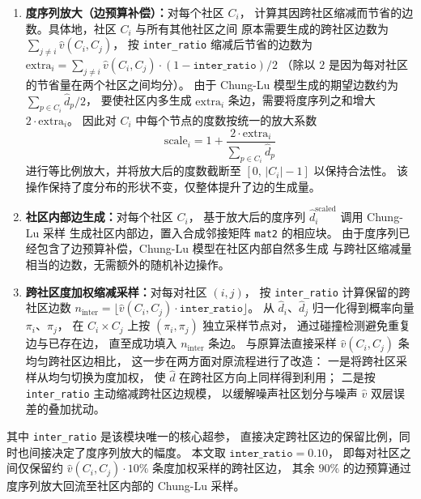 \begin{enumerate}
    \item \textbf{度序列放大（边预算补偿）：}对每个社区 $C_i$，
    计算其因跨社区缩减而节省的边数。具体地，社区 $C_i$ 与所有其他社区之间
    原本需要生成的跨社区边数为 $\sum_{j \neq i} \hat{v}(C_i, C_j)$，
    按 \texttt{inter\_ratio} 缩减后节省的边数为
    $\mathrm{extra}_i = \sum_{j \neq i} \hat{v}(C_i, C_j) \cdot (1 - \texttt{inter\_ratio}) / 2$
    （除以 $2$ 是因为每对社区的节省量在两个社区之间均分）。
    由于 Chung-Lu 模型生成的期望边数约为 $\sum_{p \in C_i} \hat{d}_p / 2$，
    要使社区内多生成 $\mathrm{extra}_i$ 条边，需要将度序列之和增大 $2 \cdot \mathrm{extra}_i$。
    因此对 $C_i$ 中每个节点的度数按统一的放大系数
    \begin{equation}
        \label{equ:scale-factor}
        \mathrm{scale}_i = 1 + \frac{2 \cdot \mathrm{extra}_i}{\sum_{p \in C_i} \hat{d}_p}
    \end{equation}
    进行等比例放大，并将放大后的度数截断至 $[0,\, |C_i| - 1]$ 以保持合法性。
    该操作保持了度分布的形状不变，仅整体提升了边的生成量。

    \item \textbf{社区内部边生成：}对每个社区 $C_i$，
    基于放大后的度序列 $\hat{d}_i^{\mathrm{scaled}}$ 调用 Chung-Lu 采样
    生成社区内部边，置入合成邻接矩阵 \texttt{mat2} 的相应块。
    由于度序列已经包含了边预算补偿，Chung-Lu 模型在社区内部自然多生成
    与跨社区缩减量相当的边数，无需额外的随机补边操作。

    \item \textbf{跨社区度加权缩减采样：}对每对社区 $(i, j)$，
    按 \texttt{inter\_ratio} 计算保留的跨社区边数 
    $n_{\mathrm{inter}} = \lfloor \hat{v}(C_i, C_j) \cdot \texttt{inter\_ratio} \rfloor$。
    从 $\hat{d}_i$、$\hat{d}_j$ 归一化得到概率向量 $\pi_i$、$\pi_j$，
    在 $C_i \times C_j$ 上按 $(\pi_i, \pi_j)$ 独立采样节点对，
    通过碰撞检测避免重复边与已存在边，
    直至成功填入 $n_{\mathrm{inter}}$ 条边。
    与原算法直接采样 $\hat{v}(C_i, C_j)$ 条均匀跨社区边相比，
    这一步在两方面对原流程进行了改造：
    一是将跨社区采样从均匀切换为度加权，
    使 $\hat{d}$ 在跨社区方向上同样得到利用；
    二是按 \texttt{inter\_ratio} 主动缩减跨社区边规模，
    以缓解噪声社区划分与噪声 $\hat{v}$ 双层误差的叠加扰动。
\end{enumerate}

\par 其中 \texttt{inter\_ratio} 是该模块唯一的核心超参，
直接决定跨社区边的保留比例，同时也间接决定了度序列放大的幅度。
本文取 $\texttt{inter\_ratio} = 0.10$，
即每对社区之间仅保留约 $\hat{v}(C_i, C_j) \cdot 10\%$ 条度加权采样的跨社区边，
其余 $90\%$ 的边预算通过度序列放大回流至社区内部的 Chung-Lu 采样。

